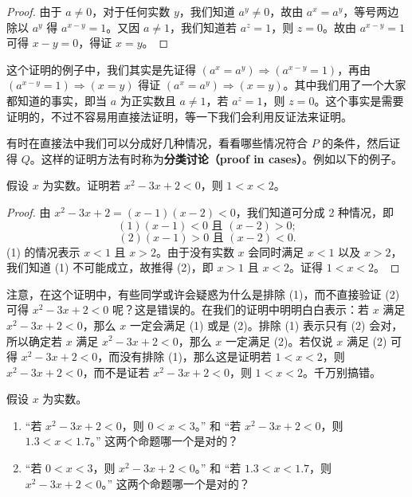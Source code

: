 \begin{proof}
由于 $a \neq 0$，对于任何实数 $y$，我们知道 $a^{y} \neq 0$，故由 $a^{x} = a^{y}$，等号两边除以 $a^{y}$ 得 $a^{x - y} = 1$。又因 $a \neq 1$，我们知道若 $a^{z} = 1$，则 $z = 0$。故由 $a^{x - y} = 1$ 可得 $x - y = 0$，得证 $x = y$。
\end{proof}

这个证明的例子中，我们其实是先证得 $(a^x = a^y) \Rightarrow (a^{x - y} = 1)$，再由 $(a^{x - y} = 1) \Rightarrow (x = y)$ 得证 $(a^x = a^y) \Rightarrow (x = y)$。其中我们用了一个大家都知道的事实，即当 $a$ 为正实数且 $a \neq 1$，若 $a^{z} = 1$，则 $z = 0$。这个事实是需要证明的，不过不容易用直接法证明，等一下我们会利用反证法来证明。

有时在直接法中我们可以分成好几种情况，看看哪些情况符合 $P$ 的条件，然后证得 $Q$。这样的证明方法有时称为\textbf{分类讨论（proof in cases）}。例如以下的例子。

\begin{example}
假设 $x$ 为实数。证明若 $x^2 - 3x + 2 < 0$，则 $1 < x < 2$。
\end{example}

\begin{proof}
由 $x^2 - 3x + 2 = (x - 1)(x - 2) < 0$，我们知道可分成 2 种情况，即
\[(1) (x - 1) < 0 \text{ 且 } (x - 2) > 0;\]
\[(2) (x - 1) > 0 \text{ 且 } (x - 2) < 0.\]
(1) 的情况表示 $x < 1$ 且 $x > 2$。由于没有实数 $x$ 会同时满足 $x < 1$ 以及 $x > 2$，我们知道 (1) 不可能成立，故推得 (2)，即 $x > 1$ 且 $x < 2$。证得 $1 < x < 2$。
\end{proof}

注意，在这个证明中，有些同学或许会疑惑为什么是排除 (1)，而不直接验证 (2) 可得 $x^2 - 3x + 2 < 0$ 呢？这是错误的。在我们的证明中明明白白表示：若 $x$ 满足 $x^2 - 3x + 2 < 0$，那么 $x$ 一定会满足 (1) 或是 (2)。排除 (1) 表示只有 (2) 会对，所以确定若 $x$ 满足 $x^2 - 3x + 2 < 0$，那么 $x$ 一定满足 (2)。若仅说 $x$ 满足 (2) 可得 $x^2 - 3x + 2 < 0$，而没有排除 (1)，那么这是证明若 $1 < x < 2$，则 $x^2 - 3x + 2 < 0$，而不是证若 $x^2 - 3x + 2 < 0$，则 $1 < x < 2$。千万别搞错。

\begin{question}
假设 $x$ 为实数。
\begin{enumerate}
    \item “若 $x^2 - 3x + 2 < 0$，则 $0 < x < 3$。” 和 “若 $x^2 - 3x + 2 < 0$，则 $1.3 < x < 1.7$。” 这两个命题哪一个是对的？
    \item “若 $0 < x < 3$，则 $x^2 - 3x + 2 < 0$。” 和 “若 $1.3 < x < 1.7$，则 $x^2 - 3x + 2 < 0$。” 这两个命题哪一个是对的？
\end{enumerate}
\end{question}

